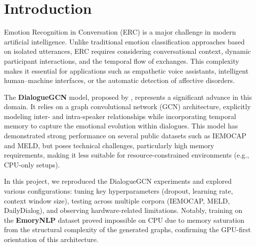 \documentclass[a4paper,11pt]{article}
\begin{document}

\tableofcontents
\listoffigures
{}
\listoftables
{}
\newpage


\section{Introduction}
Emotion Recognition in Conversation (ERC) is a major challenge in modern artificial intelligence. Unlike traditional emotion classification approaches based on isolated utterances, ERC requires considering conversational context, dynamic participant interactions, and the temporal flow of exchanges. This complexity makes it essential for applications such as empathetic voice assistants, intelligent human–machine interfaces, or the automatic detection of affective disorders.

The \textbf{DialogueGCN} model, proposed by \cite{ghosal2019dialoguegcn}, represents a significant advance in this domain. It relies on a graph convolutional network (GCN) architecture, explicitly modeling inter- and intra-speaker relationships while incorporating temporal memory to capture the emotional evolution within dialogues. This model has demonstrated strong performance on several public datasets such as IEMOCAP and MELD, but poses technical challenges, particularly high memory requirements, making it less suitable for resource-constrained environments (e.g., CPU-only setups).

In this project, we reproduced the DialogueGCN experiments and explored various configurations: tuning key hyperparameters (dropout, learning rate, context window size), testing across multiple corpora (IEMOCAP, MELD, DailyDialog), and observing hardware-related limitations. Notably, training on the \textbf{EmoryNLP} dataset proved impossible on CPU due to memory saturation from the structural complexity of the generated graphs, confirming the GPU-first orientation of this architecture.
\end{document}

